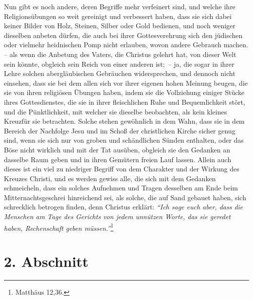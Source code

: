 Nun gibt es noch andere, deren Begriffe mehr
verfeinert sind, und welche ihre
Religionsübungen so weit
gereinigt und verbessert haben, dass sie sich dabei keiner Bilder von Holz,
Steinen, Silber oder Gold bedienen,
und noch weniger dieselben anbeten dürfen, die auch bei ihrer Gottesverehrung
sich den jüdischen oder vielmehr heidnischen Pomp nicht
erlauben, wovon andere
Gebrauch
machen.  -- als wenn die Anbetung des Vaters, die Christus
gelehrt hat, von
dieser Welt sein könnte, obgleich sein Reich von einer anderen ist;~-- ja, die
sogar in ihrer Lehre solchen abergläubischen Gebräuchen widersprechen, und
dennoch nicht einsehen, dass sie bei dem allen sich vor ihrer eigenen hohen
Meinung beugen, die sie von ihren religiösen Übungen haben, indem sie die
Vollziehung einiger Stücke ihres Gottesdienstes, die sie in ihrer fleischlichen
Ruhe und Bequemlichkeit stört, und die Pünktlichkeit, mit
welcher sie dieselbe
beobachten, als
kein kleines Kreuzfür sie betrachten. Solche stehen
gewöhnlich in dem Wahn,
dass sie in dem Bereich der Nachfolge Jesu und im Schoß der christlichen
Kirche sicher genug sind, wenn sie sich nur von groben und schändlichen Sünden
enthalten, oder das Böse
nicht wirklich und mit der Tat ausüben, obgleich sie
den Gedanken an dasselbe Raum geben und in ihren Gemütern freien Lauf lassen.
Allein auch dieses ist ein viel zu niedriger Begriff von dem Charakter und der
Wirkung des Kreuzes Christi, und es werden gewiss alle, die sich mit dem
Gedanken schmeicheln, dass ein solches Aufnehmen und Tragen desselben am Ende
beim Mitternachtsgeschrei
hinreichend sei, als
solche, die auf Sand
gebauet haben, sich schrecklich betrogen finden, denn Christus erklärt:
\textit{"`Ich sage euch aber, dass die Menschen am Tage des Gerichts von jedem
unnützen Worte, das sie geredet haben, Rechenschaft geben
müssen."'}\footnote{Matthäus 12,36.}

\section{2. Abschnitt} \label{kap6_ab2}

